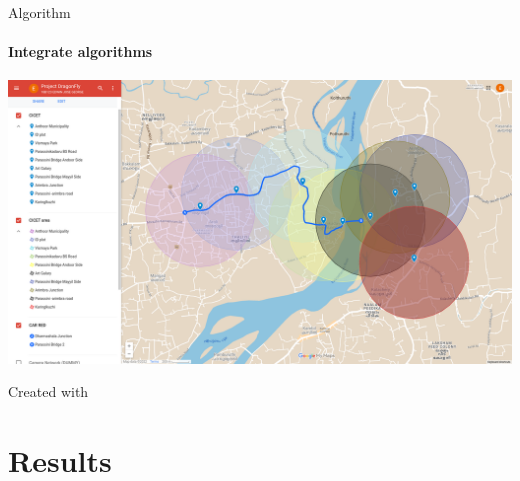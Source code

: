 \documentclass{beamer}
\newcommand{\link}[2]{\href{#1}{\textit{\color{blue}{#2}}}}%
\begin{document}
	\begin{frame}{Algorithm}
		\framesubtitle{Integrate algorithms}
		\begin{center}
			\includegraphics[height=0.7\textheight]{res/algo_map}
		\end{center}
		Created with \link{https://www.google.com/maps/d/edit?mid=1s2ST5x4nn-EK3JqU-c9EEGASRq5Ini0&usp=sharing}{Google Maps}
	\end{frame}
	
	



	\section{Results}
\end{document}
